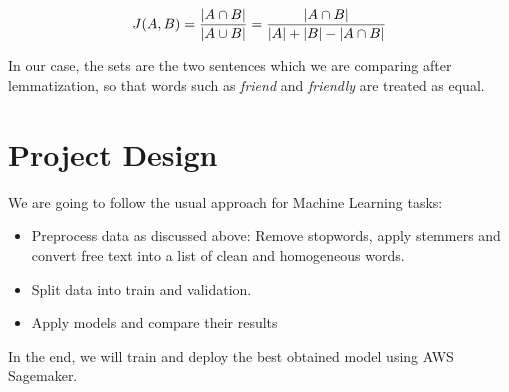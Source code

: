 \documentclass[11pt]{article}
\begin{document}
\[
J(A,B) = {{|A \cap B|}\over{|A \cup B|}} = {{|A \cap B|}\over{|A| + |B| - |A \cap B|}}
\]

In our case, the sets are the two sentences which we are comparing after lemmatization, so that words such as \textit{friend} and \textit{friendly} are treated as equal.

\section{Project Design}

We are going to follow the usual approach for Machine Learning tasks:

\begin{itemize}
    \item Preprocess data as discussed above: Remove stopwords, apply stemmers and convert free text into a list of clean and homogeneous words.
    \item Split data into train and validation.
    \item Apply models and compare their results
\end{itemize}

In the end, we will train and deploy the best obtained model using AWS Sagemaker.
\end{document}
